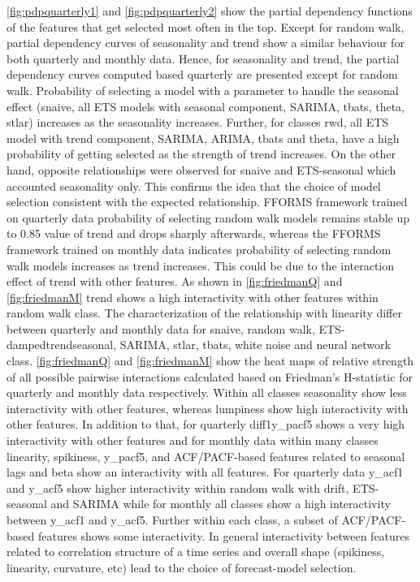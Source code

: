 \documentclass[11pt,a4paper,]{article}
\begin{document}
\autoref{fig:pdpquarterly1} and \autoref{fig:pdpquarterly2} show the
partial dependency functions of the features that get selected most
often in the top. Except for random walk, partial dependency curves of
seasonality and trend show a similar behaviour for both quarterly and
monthly data. Hence, for seasonality and trend, the partial dependency
curves computed based quarterly are presented except for random walk.
Probability of selecting a model with a parameter to handle the seasonal
effect (snaive, all ETS models with seasonal component, SARIMA, tbats,
theta, stlar) increases as the seasonality increases. Further, for
classes rwd, all ETS model with trend component, SARIMA, ARIMA, tbats
and theta, have a high probability of getting selected as the strength
of trend increases. On the other hand, opposite relationships were
observed for snaive and ETS-seasonal which accounted seasonality only.
This confirms the idea that the choice of model selection consistent
with the expected relationship. FFORMS framework trained on quarterly
data probability of selecting random walk models remains stable up to
0.85 value of trend and drops sharply afterwards, whereas the FFORMS
framework trained on monthly data indicates probability of selecting
random walk models increases as trend increases. This could be due to
the interaction effect of trend with other features. As shown in
\autoref{fig:friedmanQ} and \autoref{fig:friedmanM} trend shows a high
interactivity with other features within random walk class. The
characterization of the relationship with linearity differ between
quarterly and monthly data for snaive, random walk,
ETS-dampedtrendseasonal, SARIMA, stlar, tbats, white noise and neural
network class. \autoref{fig:friedmanQ} and \autoref{fig:friedmanM} show
the heat maps of relative strength of all possible pairwise interactions
calculated based on Friedman's H-statistic for quarterly and monthly
data respectively. Within all classes seasonality show less
interactivity with other features, whereas lumpiness show high
interactivity with other features. In addition to that, for quarterly
diff1y\_pacf5 shows a very high interactivity with other features and
for monthly data within many classes linearity, spikiness, y\_pacf5, and
ACF/PACF-based features related to seasonal lags and beta show an
interactivity with all features. For quarterly data y\_acf1 and y\_acf5
show higher interactivity within random walk with drift, ETS-seasonal
and SARIMA while for monthly all classes show a high interactivity
between y\_acf1 and y\_acf5. Further within each class, a subset of
ACF/PACF-based features shows some interactivity. In general
interactivity between features related to correlation structure of a
time series and overall shape (spikiness, linearity, curvature, etc)
lead to the choice of forecast-model selection.
\end{document}
